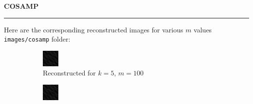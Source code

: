 \documentclass[a4paper,12pt]{article}
\newenvironment{solution}[2][]{%
    \begin{mdframed}[linecolor=blue!70!black, linewidth=2pt, roundcorner=10pt, backgroundcolor=yellow!10!white, skipabove=12pt, skipbelow=12pt]%
        \textbf{\large #2}
        \par\noindent\rule{\textwidth}{0.4pt}
}{
    \end{mdframed}
}
\begin{document}
\begin{solution}{COSAMP}
    Here are the corresponding reconstructed images for various $m$ values \texttt{images/cosamp} folder:
    
    \begin{figure}[H]
      \centering
      \begin{subfigure}[t]{0.23\textwidth}
          \centering
          \includegraphics[width=\textwidth]{../images/cosamp/Reconstructed_k_5_m_100.png}
          \caption{Reconstructed for $k = 5$, $m = 100$}
      \end{subfigure}
        \begin{subfigure}[t]{0.23\textwidth}
            \centering
            \includegraphics[width=\textwidth]{../images/cosamp/Reconstructed_k_5_m_200.png}

\end{subfigure}
\end{figure}
\end{solution}
\end{document}
